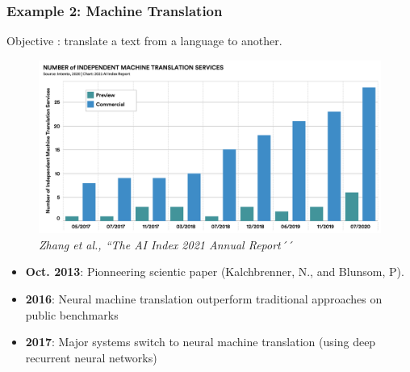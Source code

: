 \documentclass[handout, 10pt]{beamer}
\newcommand{\rref}[1][]{\hfill{\scriptsize\textit{#1}}}
\begin{document}
\begin{frame}
\frametitle{Example 2: Machine Translation}
Objective : translate a text from a language to another.
\begin{figure}
\includegraphics[width=.5\textwidth]{fig/L1/progress-machine-translation.png}\\
  \rref[Zhang et al., ``The AI Index 2021 Annual Report´´]

\end{figure}

\begin{itemize}
\item {\bf Oct. 2013}: Pionneering scientic paper  (Kalchbrenner, N., and Blunsom, P).
\item {\bf 2016}: Neural machine translation outperform traditional approaches on public benchmarks
\item {\bf 2017}: Major systems  switch to
  neural machine translation  (using deep recurrent neural networks)
\end{itemize}
\end{frame}
\end{document}
